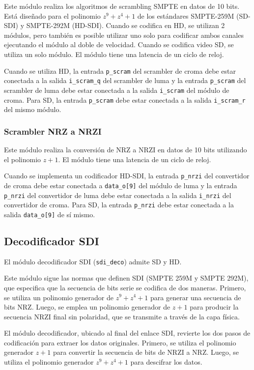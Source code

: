 Este módulo realiza los algoritmos de scrambling SMPTE en datos de 10 bits.
Está diseñado para el polinomio $z^9+z^4+1$ de los estándares SMPTE-259M
(SD-SDI) y SMPTE-292M (HD-SDI). Cuando se codifica en HD, se utilizan 2 módulos,
pero también es posible utilizar uno solo para codificar ambos canales
ejecutando el módulo al doble de velocidad. Cuando se codifica video SD, se utiliza
un solo módulo. El módulo tiene una latencia de un ciclo de reloj.

Cuando se utiliza HD, la entrada \texttt{p\_scram} del scrambler de croma debe
estar conectada a la salida \texttt{i\_scram\_q} del scrambler de luma y la entrada
\texttt{p\_scram} del scrambler de luma debe estar conectada a la salida
\texttt{i\_scram} del módulo de croma. Para SD, la entrada \texttt{p\_scram} debe
estar conectada a la salida \texttt{i\_scram\_r} del mismo módulo.

\subsubsection{Scrambler NRZ a NRZI}

Este módulo realiza la conversión de NRZ a NRZI en datos de 10 bits utilizando el
polinomio $z+1$. El módulo tiene una latencia de un ciclo de reloj.

Cuando se implementa un codificador HD-SDI, la entrada \texttt{p\_nrzi} del
convertidor de croma debe estar conectada a \texttt{data\_o[9]} del módulo de luma
y la entrada \texttt{p\_nrzi} del convertidor de luma debe estar conectada a la
salida \texttt{i\_nrzi} del convertidor de croma. Para SD, la entrada
\texttt{p\_nrzi} debe estar conectada a la salida \texttt{data\_o[9]} de sí mismo.

\subsection{Decodificador SDI}

El módulo decodificador SDI (\texttt{sdi\_deco}) admite SD y HD\@.

Este módulo sigue las normas que definen SDI (SMPTE 259M y SMPTE 292M), que
especifica que la secuencia de bits serie se codifica de dos maneras. Primero,
se utiliza un polinomio generador de $z^9+z^4+1$ para generar una secuencia de
bits NRZ\@. Luego, se emplea un polinomio generador de $z+1$ para producir la
secuencia NRZI final sin polaridad, que se transmite a través de la capa física.

El módulo decodificador, ubicado al final del enlace SDI, revierte los dos pasos
de codificación para extraer los datos originales. Primero, se utiliza el
polinomio generador $z+1$ para convertir la secuencia de bits de NRZI a NRZ\@.
Luego, se utiliza el polinomio generador $z^9+z^4+1$ para descifrar los datos.

